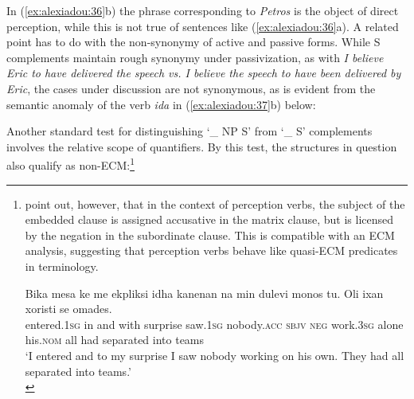 \documentclass[output=paper]{langsci/langscibook}
\begin{document}
In (\ref{ex:alexiadou:36}b) the phrase corresponding to \textit{Petros} is the object of direct perception, while this is not true of sentences like (\ref{ex:alexiadou:36}a). A related point has to do with the non-synonymy of active and passive forms. While S complements maintain rough synonymy under passivization, as with \textit{I believe Eric to have delivered the speech vs. I believe the speech to have been delivered by Eric}, the cases under discussion are not synonymous, as is evident from the semantic anomaly of the verb \textit{ida} in (\ref{ex:alexiadou:37}b) below:

\ea%
    \label{ex:alexiadou:37}
    \z
\z
    
Another standard test for distinguishing ‘\_ NP S' from ‘\_ S' complements involves the relative scope of quantifiers. By this test, the structures in question also qualify as non-ECM:\footnote{\citet{Alexiadou2016} point out, however, that in the context of perception verbs, the subject of the embedded clause is assigned accusative in the matrix clause, but is licensed by the negation in the subordinate clause. This is compatible with an ECM analysis, suggesting that perception verbs behave like quasi-ECM predicates in  terminology.\largerpage

\ea \gll Bika  mesa    ke me     ekpliksi idha       kanenan         na min dulevi monos tu. Oli ixan             xoristi      se omades.\\
        entered{}.\textsc{1sg} in   and with   surprise saw{}.\textsc{1sg} nobody{}.\textsc{acc}  \textsc{sbjv}  \textsc{neg} work{}.\textsc{3sg} alone his.\textsc{nom}    all had separated into teams\\
    \glt ‘I entered and to my surprise I saw nobody working on his own. They had all separated into teams.’\\
\z}
\end{document}
